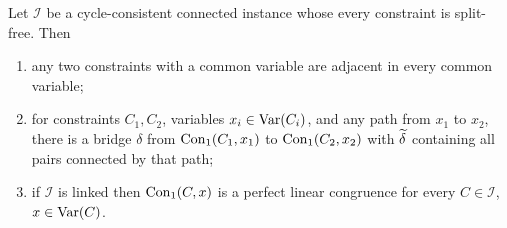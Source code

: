 \begin{lemma}\label{lem:connected}
Let $\mathcal I$ be a cycle-consistent connected instance whose every
constraint is split-free. Then
\begin{enumerate}\tightlist
\item[\textup{(a)}] any two constraints with a common variable are adjacent
  in every common variable;
\item[\textup{(b)}] for constraints $C_{1},C_{2}$, variables
  $x_{i}\in\operatorname{Var}(C_{i})$, and any path from $x_{1}$ to $x_{2}$, there is a
  bridge $\delta$ from $\operatorname{Con}_1(C_{1},x_{1})$ to $\operatorname{Con}_1(C_{2},x_{2})$ with
  $\widetilde{\delta}$ containing all pairs connected by that path;
\item[\textup{(p)}] if $\mathcal I$ is linked then $\operatorname{Con}_1(C,x)$ is a perfect
  linear congruence for every $C\in\mathcal I$, $x\in\operatorname{Var}(C)$.
\end{enumerate}
\end{lemma}


